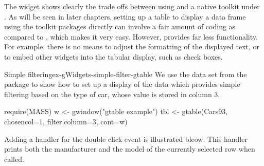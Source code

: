 The  widget shows clearly the trade offs between
using  and a native toolkit under \R. As will be seen in
later chapters, setting up a table to display a data frame using the
toolkit packages directly can involve a fair amount of coding as
compared to , which makes it very easy. However,
 provides far less functionality. For example, there is
no means to adjust the formatting of the displayed text, or to embed
other widgets into the tabular display, such as check boxes.

\begin{example}{Simple filtering}{ex-gWidgets-simple-filter-gtable}
  We use the  data set from the  package to
  show how to set up a display of the data which provides simple
  filtering based on the type of car, whose value is stored in column 3.
  
\begin{Schunk}
\begin{Sinput}
 require(MASS)
 w <- gwindow("gtable example")
 tbl <- gtable(Cars93, chosencol=1, filter.column=3, cont=w)
\end{Sinput}
\end{Schunk}

Adding a handler for the double click event is illustrated bleow. This
handler prints both the manufacturer and the model of the currently
selected row when called.
\begin{Schunk}
\end{Schunk}
\end{example}


